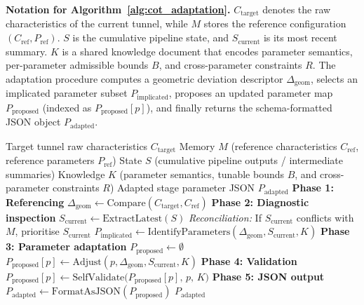\documentclass[a4paper,fleqn]{cas-dc}
\begin{document}
\noindent\textbf{Notation for Algorithm~\ref{alg:cot_adaptation}.} $C_{\text{target}}$ denotes the raw characteristics of the current tunnel, while $M$ stores the reference configuration $(C_{\text{ref}}, P_{\text{ref}})$. $S$ is the cumulative pipeline state, and $S_{\text{current}}$ is its most recent summary. $K$ is a shared knowledge document that encodes parameter semantics, per-parameter admissible bounds $B$, and cross-parameter constraints $R$. The adaptation procedure computes a geometric deviation descriptor $\Delta_{\text{geom}}$, selects an implicated parameter subset $P_{\text{implicated}}$, proposes an updated parameter map $P_{\text{proposed}}$ (indexed as $P_{\text{proposed}}[p]$), and finally returns the schema-formatted JSON object $P_{\text{adapted}}$.

\begin{algorithm}[ht]
\caption{LLM-driven Parameter Adaptation via CoT}\label{alg:cot_adaptation}
\begin{algorithmic}[1]
\Require Target tunnel raw characteristics $C_{\text{target}}$
\Require Memory $M$ (reference characteristics $C_{\text{ref}}$, reference parameters $P_{\text{ref}}$)
\Require State $S$ (cumulative pipeline outputs / intermediate summaries)
\Require Knowledge $K$ (parameter semantics, tunable bounds $B$, and cross-parameter constraints $R$)
\Ensure Adapted stage parameter JSON $P_{\text{adapted}}$
\State \textbf{Phase 1: Referencing}
\State $\Delta_{\text{geom}} \gets \text{Compare}(C_{\text{target}}, C_{\text{ref}})$ 
\State \textbf{Phase 2: Diagnostic inspection}
\State $S_{\text{current}} \gets \text{ExtractLatest}(S)$ 
\State \textit{Reconciliation:} If $S_{\text{current}}$ conflicts with $M$, prioritise $S_{\text{current}}$
\State $P_{\text{implicated}} \gets \text{IdentifyParameters}(\Delta_{\text{geom}}, S_{\text{current}}, K)$ 
\State \textbf{Phase 3: Parameter adaptation}
\State $P_{\text{proposed}} \gets \emptyset$
    \State $P_{\text{proposed}}[p] \gets \text{Adjust}(p, \Delta_{\text{geom}}, S_{\text{current}}, K)$ 
\EndFor
\State \textbf{Phase 4: Validation}
    \State $P_{\text{proposed}}[p] \gets \text{SelfValidate}\big(P_{\text{proposed}}[p],\, p,\, K\big)$
\EndFor
\State \textbf{Phase 5: JSON output}
\State $P_{\text{adapted}} \gets \text{FormatAsJSON}(P_{\text{proposed}})$
\State \Return $P_{\text{adapted}}$
\end{algorithmic}
\end{algorithm}
\end{document}
